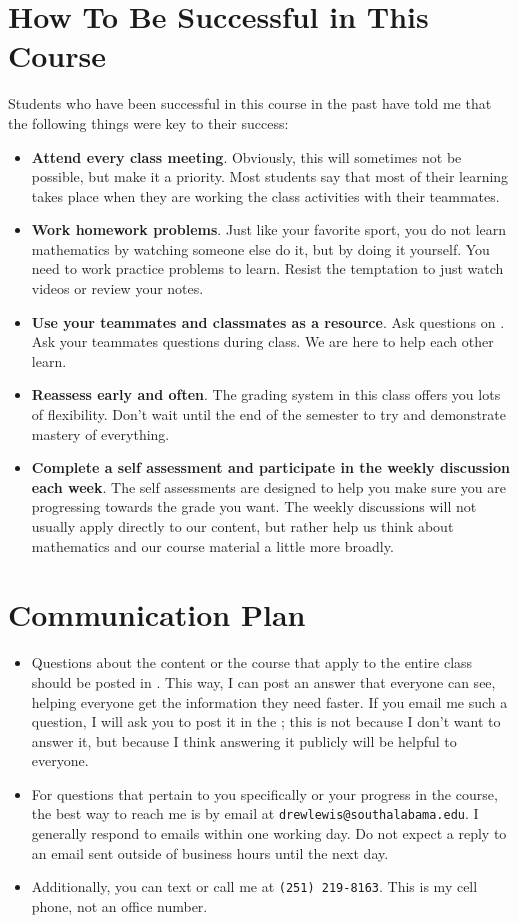 \documentclass{article}
\begin{document}
\section*{\fontsize{12}{15}\selectfont How To Be Successful in This Course}
Students who have been successful in this course in the past have told me that the following things were key to their success:
\begin{itemize}
\item \textbf{Attend every class meeting}. Obviously, this will sometimes not be possible, but make it a priority. Most students say that most of their learning takes place when they are working the class activities with their teammates.
\item \textbf{Work homework problems}. Just like your favorite sport, you do not learn mathematics by watching someone else do it, but by doing it yourself. You need to work practice problems to learn. Resist the temptation to just watch videos or review your notes.
\item \textbf{Use your teammates and classmates as a resource}. Ask questions on \LMS. Ask your teammates questions during class. We are here to help each other learn.
\item \textbf{Reassess early and often}. The grading system in this class offers you lots of flexibility. Don't wait until the end of the semester to try and demonstrate mastery of everything.
\item \textbf{Complete a self assessment and participate in the weekly discussion each week}. The self assessments are designed to help you make sure you are progressing towards the grade you want. The weekly discussions will not usually apply directly to our content, but rather help us think about mathematics and our course material a little more broadly.
\end{itemize}

\section*{\fontsize{12}{15}\selectfont Communication Plan}

\begin{itemize}
\item Questions about the content or the course that apply to the entire class should be posted in \LMS. This way, I can post an answer that everyone can see, helping everyone get the information they need faster. If you email me such a question, I will ask you to post it in the \LMS ; this is not because I don't want to answer it, but because I think answering it publicly will be helpful to everyone.
\item For questions that pertain to you specifically or your progress in the course, the best way to reach me is by email at {\tt drewlewis@southalabama.edu}. I generally respond to emails within one working day.  Do not expect a reply to an email sent outside of business hours until the next day.
\item Additionally, you can text or call me at {\tt(251) 219-8163}. This is my cell phone, not an office number.
\end{itemize}
\end{document}
